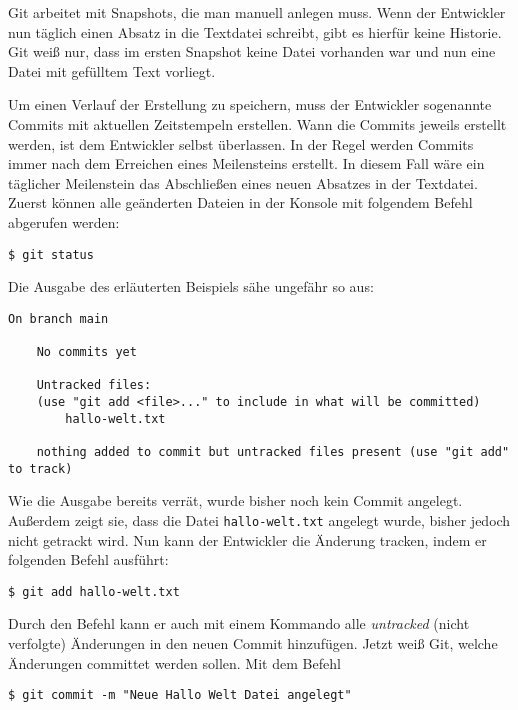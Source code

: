 Git arbeitet mit Snapshots, die man manuell anlegen muss. Wenn der Entwickler
nun täglich einen Absatz in die Textdatei schreibt, gibt es hierfür keine
Historie. Git weiß nur, dass im ersten Snapshot keine Datei vorhanden war und
nun eine Datei mit gefülltem Text vorliegt.

Um einen Verlauf der Erstellung zu speichern, muss der Entwickler sogenannte
Commits mit aktuellen Zeitstempeln erstellen. Wann die Commits jeweils erstellt
werden, ist dem Entwickler selbst überlassen. In der Regel werden Commits immer
nach dem Erreichen eines Meilensteins erstellt. In diesem Fall wäre ein
täglicher Meilenstein das Abschließen eines neuen Absatzes in der Textdatei.
Zuerst können alle geänderten Dateien in der Konsole mit folgendem Befehl
abgerufen werden:

\begin{lstlisting}[style=Bash]
    $ git status
\end{lstlisting}

Die Ausgabe des erläuterten Beispiels sähe ungefähr so aus:

\begin{lstlisting}[style=Bash]
    On branch main

    No commits yet

    Untracked files:
    (use "git add <file>..." to include in what will be committed)
        hallo-welt.txt

    nothing added to commit but untracked files present (use "git add" to track)
\end{lstlisting}

Wie die Ausgabe bereits verrät, wurde bisher noch kein Commit angelegt. Außerdem
zeigt sie, dass die Datei \texttt{hallo-welt.txt} angelegt wurde, bisher jedoch
nicht getrackt wird. Nun kann der Entwickler die Änderung tracken, indem er
folgenden Befehl ausführt:

\begin{lstlisting}[style=Bash]
    $ git add hallo-welt.txt
\end{lstlisting}

Durch den Befehl  kann er auch mit einem Kommando alle
\emph{untracked} (nicht verfolgte) Änderungen in den neuen Commit hinzufügen.
Jetzt weiß Git, welche Änderungen committet werden sollen. Mit dem Befehl

\begin{lstlisting}[style=Bash]
    $ git commit -m "Neue Hallo Welt Datei angelegt"
\end{lstlisting}

